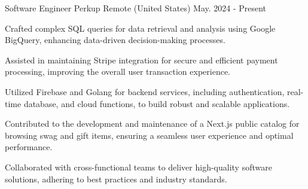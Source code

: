 

\begin{cventries}

\cventry
{Software Engineer} %
{Perkup} %
{Remote (United States)} %
{May. 2024 - Present} %
{
  \begin{cvitems} %
    \item{Crafted complex SQL queries for data retrieval and analysis using Google BigQuery, enhancing data-driven decision-making processes.}
    \item{Assisted in maintaining Stripe integration for secure and efficient payment processing, improving the overall user transaction experience.}
    \item{Utilized Firebase and Golang for backend services, including authentication, real-time database, and cloud functions, to build robust and scalable applications.}
    \item{Contributed to the development and maintenance of a Next.js public catalog for browsing swag and gift items, ensuring a seamless user experience and optimal performance.}
    \item{Collaborated with cross-functional teams to deliver high-quality software solutions, adhering to best practices and industry standards.}
  \end{cvitems}
}



\end{cventries}
